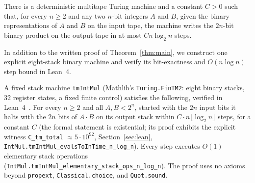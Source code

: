 \begin{maintheorem}\label{thm:main}
There is a deterministic multitape Turing machine and a constant $C > 0$ such that, for every $n \ge 2$ and any two $n$-bit integers $A$ and $B$, given the binary representations of $A$ and $B$ on the input tape, the machine writes the $2n$-bit binary product on the output tape in at most $C n \log_2 n$ steps.
\end{maintheorem}

In addition to the written proof of Theorem~\ref{thm:main}, we construct one explicit eight-stack binary machine and verify its bit-exactness and $O(n \log n)$ step bound in Lean~4.

\begin{maintheorem}\label{thm:lean}
A fixed stack machine \texttt{tmIntMul} (Mathlib's \texttt{Turing.FinTM2}: eight binary stacks, $32$ register states, a fixed finite control) satisfies the following, verified in Lean~4~\cite{dMU21,Mathlib20}. For every $n \ge 2$ and all $A, B < 2^n$, started with the $2n$ input bits it halts with the $2n$ bits of $A \cdot B$ on its output stack within $C \cdot n \lfloor \log_2 n \rfloor$ steps, for a constant $C$ (the formal statement is existential; its proof exhibits the explicit witness \texttt{C\_tm\_total} $\approx 5\cdot 10^{92}$, Section~\ref{sec:lean}, \texttt{IntMul.\allowbreak tmIntMul\_\allowbreak evalsToInTime\_\allowbreak n\_\allowbreak log\_\allowbreak n}). Every step executes $O(1)$ elementary stack operations (\texttt{IntMul.\allowbreak tmIntMul\_\allowbreak elementary\_\allowbreak stack\_\allowbreak ops\_\allowbreak n\_\allowbreak log\_\allowbreak n}). The proof uses no axioms beyond \texttt{propext}, \texttt{Classical.choice}, and \texttt{Quot.sound}.
\end{maintheorem}

